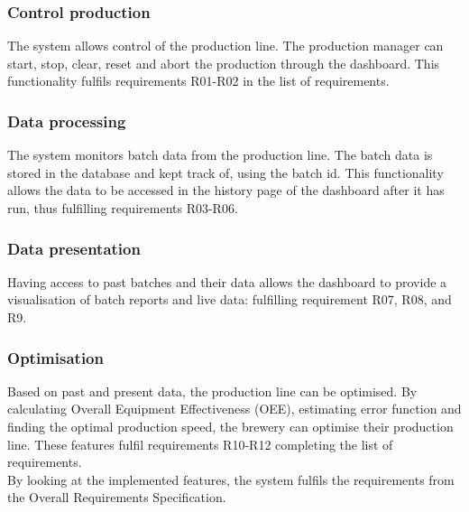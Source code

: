 \subsubsection{Control production} 
The system allows control of the production line. The production manager can
start, stop, clear, reset and abort the production through the dashboard. This
functionality fulfils requirements R01-R02 in the list of requirements.

\subsubsection{Data processing}
The system monitors batch data from the production line. The batch data is
stored in the database and kept track of, using the batch id. This functionality
allows the data to be accessed in the history page of the dashboard after it has
run, thus fulfilling requirements R03-R06.

\subsubsection{Data presentation}
Having access to past batches and their data allows the dashboard to provide a
visualisation of batch reports and live data: fulfilling requirement R07, R08,
and R9.

\subsubsection{Optimisation}
Based on past and present data, the production line can be optimised. By
calculating Overall Equipment Effectiveness (OEE), estimating error function and
finding the optimal production speed, the brewery can optimise their production
line. These features fulfil requirements R10-R12 completing the list of
requirements. \\

By looking at the implemented features, the system fulfils the requirements from
the Overall Requirements Specification.
